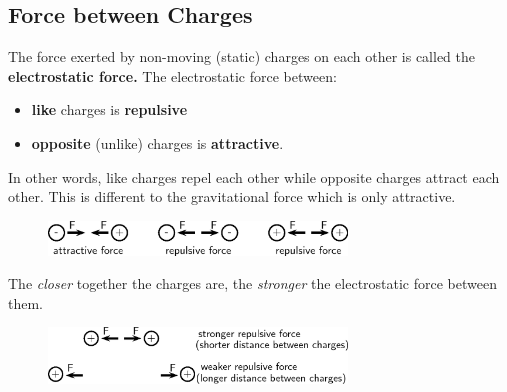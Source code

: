             \subsection{ Force between Charges}
            \nopagebreak
            \label{m38780*id200840}The force exerted by non-moving (static) charges on each other is called the \textbf{electrostatic force.} The electrostatic force between:\par 
      \label{m38780*id200849}\begin{itemize}[noitemsep]
            \label{m38780*uid1}\item \textbf{like} charges is \textbf{repulsive}\label{m38780*uid2}\item \textbf{opposite} (unlike) charges is \textbf{attractive}.
\end{itemize}
      \label{m38780*id200894}In other words, like charges repel each other while opposite
charges attract each other. This is different to the gravitational force which is only attractive.\par 
      \label{m38780*id200898}
    \setcounter{subfigure}{0}
	\begin{figure}[H] %
    \begin{center}
    \label{m38780*id200901!!!underscore!!!media}\label{m38780*id200901!!!underscore!!!printimage}\includegraphics[width=300px]{col11305.imgs/m38780_PG10C8_004.png} %
      \vspace{2pt}
    \vspace{.1in}
    \end{center}
 \end{figure}       
      \par 
      \label{m38780*id200907}The \textsl{closer} together the charges are, the \textsl{stronger} the electrostatic force between them.\par 
      \label{m38780*id200921}
    \setcounter{subfigure}{0}
	\begin{figure}[H] %
    \begin{center}
    \label{m38780*id200924!!!underscore!!!media}\label{m38780*id200924!!!underscore!!!printimage}\includegraphics[width=300px]{col11305.imgs/m38780_PG10C8_005.png} %
      \vspace{2pt}
    \vspace{.1in}
    \end{center}
 \end{figure}       
      \par 
\label{m38780*secfhsst!!!underscore!!!id162}
